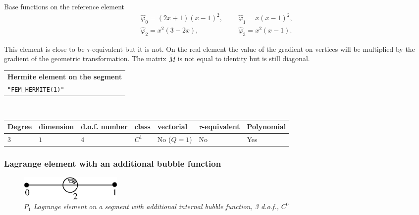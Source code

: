 \documentclass[10pt,a4paper]{article}
\begin{document}
Base functions on the reference element
\begin{eqnarray*}
 \hat{\varphi}_0 = (2x+1)(x-1)^2,&&\ \ \ \hat{\varphi}_1 = x(x-1)^2, \\
 \hat{\varphi}_2 = x^2(3-2x),&& \ \ \ \hat{\varphi}_3 = x^2(x - 1). 
\end{eqnarray*}

This element is close to be \mbox{$\tau$-equivalent} but it is not. On the real element the value of the gradient on vertices will be multiplied by the gradient of the geometric transformation. The matrix $\tilde{M}$ is not equal to identity but is still diagonal.

\begin{center}
\begin{tabular}{|m{16.11cm}|} \hline 
{\bf Hermite element on the segment}\\
{\tt "FEM\_HERMITE(1)"}
\end{tabular} \\ \vspace{-1pt} 
\begin{tabular}{|m{2cm}|m{2cm}|m{2.5cm}|m{1.2cm}|m{2cm}|m{2cm}|m{1.8cm}|} \hline 
Degree & dimension & d.o.f. number & class & vectorial & \mbox{$\tau$-equivalent} & Polynomial\\ \hline
$3$ & $1$ & $4$ & $C^1$ & No \mbox{($Q = 1$)} & No & Yes\\ \hline
\end{tabular}
\end{center}

\subsubsection{Lagrange element with an additional bubble function}

\begin{figure}[H]
  \begin{center}
    \includegraphics[width=5cm,angle=0]{getfemlist_segment_bubble.eps}
  \end{center}
  \caption{ \it $P_1$ Lagrange element on a segment with additional internal bubble function, 3 d.o.f., $C^0$} 
  \label{fig:segment_bubble}
\end{figure}
\end{document}
